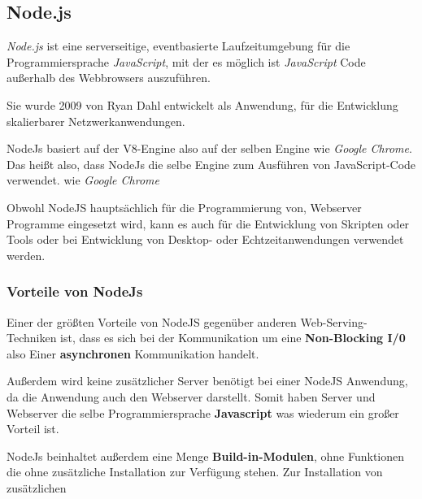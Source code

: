 \subsection{Node.js}
\label{nodejs}

\textit{Node.js} ist eine serverseitige, eventbasierte Laufzeitumgebung für die
Programmiersprache \textit{JavaScript},
mit der es möglich ist \textit{JavaScript} Code
außerhalb des Webbrowsers auszuführen.

Sie wurde 2009 von Ryan Dahl entwickelt als Anwendung, für die Entwicklung skalierbarer
Netzwerkanwendungen.

NodeJs basiert auf der V8-Engine also auf der selben Engine wie \textit{Google Chrome}.
Das heißt also, dass NodeJs die selbe Engine zum Ausführen von JavaScript-Code verwendet.
wie \textit{Google Chrome}

Obwohl NodeJS hauptsächlich für die Programmierung von, Webserver
Programme eingesetzt wird, kann es auch für die Entwicklung von
Skripten oder Tools oder bei Entwicklung von Desktop- oder Echtzeitanwendungen
verwendet werden.

\subsubsection{Vorteile von NodeJs}
Einer der größten Vorteile von NodeJS gegenüber anderen Web-Serving-Techniken ist,
dass es sich bei der Kommunikation um eine \textbf{Non-Blocking I/0} also Einer
\textbf{asynchronen } Kommunikation handelt.

Außerdem wird keine zusätzlicher Server benötigt bei einer NodeJS Anwendung,
da die Anwendung auch den Webserver darstellt. Somit haben Server und Webserver
die selbe Programmiersprache \textbf{Javascript} was wiederum ein großer Vorteil ist.

NodeJs beinhaltet außerdem eine Menge \textbf{Build-in-Modulen}, ohne Funktionen
die ohne zusätzliche Installation zur Verfügung stehen.
Zur Installation von zusätzlichen
\cite{NodeJs}

